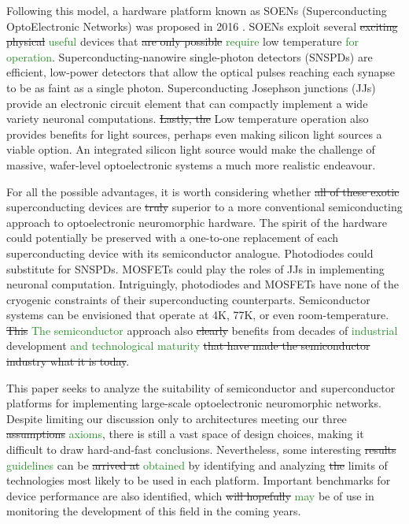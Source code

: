 \documentclass[twocolumn]{article}
\begin{document}
Following this model, a hardware platform known as SOENs (Superconducting OptoElectronic Networks) was proposed in 2016 \cite{shainline2017superconducting}. SOENs exploit several \sout{exciting physical} \textcolor{ForestGreen}{useful} devices that \sout{are only possible} \textcolor{ForestGreen}{require} low temperature \textcolor{ForestGreen}{for operation}. Superconducting-nanowire single-photon detectors (SNSPDs) are efficient, low-power detectors that allow the optical pulses reaching each synapse to be as faint as a single photon. Superconducting Josephson junctions (JJs) provide an electronic circuit element that can compactly implement a wide variety neuronal computations. \sout{Lastly, the} Low temperature operation also provides benefits for light sources, perhaps even making silicon light sources a viable option. An integrated silicon light source would make the challenge of massive, wafer-level optoelectronic systems a much more realistic endeavour. 

For all the possible advantages, it is worth considering whether \sout{all of these exotic} superconducting devices are \sout{truly} superior to a more conventional semiconducting approach to optoelectronic neuromorphic hardware. The spirit of the hardware could potentially be preserved with a one-to-one replacement of each superconducting device with its semiconductor analogue. Photodiodes could substitute for SNSPDs. MOSFETs could play the roles of JJs in implementing neuronal computation. Intriguingly, photodiodes and MOSFETs have none of the cryogenic constraints of their superconducting counterparts. Semiconductor systems can be envisioned that operate at 4K, 77K, or even room-temperature. \sout{This} \textcolor{ForestGreen}{The semiconductor} approach also \sout{clearly} benefits from decades of \textcolor{ForestGreen}{industrial} development \textcolor{ForestGreen}{and technological maturity} \sout{that have made the semiconductor industry what it is today}.

This paper seeks to analyze the suitability of semiconductor and superconductor platforms for implementing large-scale optoelectronic neuromorphic networks. Despite limiting our discussion only to architectures meeting our three \sout{assumptions} \textcolor{ForestGreen}{axioms}, there is still a vast space of design choices, making it difficult to draw hard-and-fast conclusions. Nevertheless, some interesting \sout{results} \textcolor{ForestGreen}{guidelines} can be \sout{arrived at} \textcolor{ForestGreen}{obtained} by identifying and analyzing \sout{the} limits of technologies most likely to be used in each platform. Important benchmarks for device performance are also identified, which \sout{will hopefully} \textcolor{ForestGreen}{may} be of use in monitoring the development of this field in the coming years.
\end{document}
